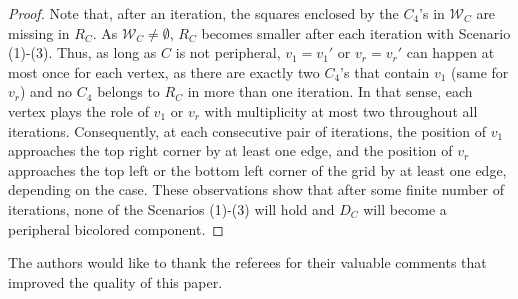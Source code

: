 \documentclass[
final, nomarks
]{dmtcs-episciences}
\begin{document}
\begin{proof}
Note that, after an iteration, the squares enclosed by the $C_4$'s in $\mathcal{W}_C$ are missing in $R_C$. As $\mathcal{W}_C\neq \emptyset$, 
$R_C$ becomes smaller after each iteration with Scenario (1)-(3). Thus, 
as long as $C$ is not peripheral, $v_1=v_1'$ or $v_r=v_r'$ can happen at most once for each vertex, as there are exactly two $C_4$'s that contain $v_1$ (same for $v_r$) and no $C_4$ belongs to $R_C$ in more than one iteration. In that sense, each vertex plays the role of $v_1$ or $v_r$ with multiplicity at most two throughout all iterations. Consequently, at each consecutive pair of iterations, the position of $v_1$ approaches the top right corner by at least one edge, and the position of $v_r$ approaches the top left or the bottom left corner of the grid  by at least one edge, depending on the case. These observations show that after some finite number of iterations, none of the Scenarios (1)-(3) will hold and $D_C$ will become a peripheral bicolored component.    
\end{proof}


\acknowledgements
\label{sec:ack}
The authors would like to thank the referees for
their valuable comments that improved the quality of this paper.



%

\label{sec:biblio}
\end{document}
